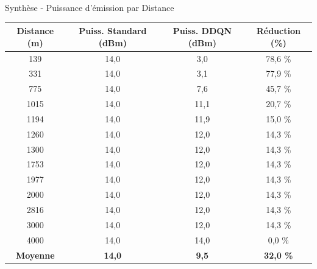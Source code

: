\documentclass[12pt,aspectratio=169]{beamer}
\begin{document}
\begin{frame}[fragile]{Synthèse - Puissance d’émission par Distance}
	\centering
	\begin{table}[H]
		\centering
		\begin{tabular}{|c|c|c|c|}
			\hline
			\textbf{Distance (m)} & \textbf{Puiss. Standard (dBm)} & \textbf{Puiss. DDQN (dBm)} & \textbf{Réduction (\%)} \\
			\hline
			139  & 14,0 & 3,0  & 78,6 \% \\
			331  & 14,0 & 3,1  & 77,9 \% \\
			775  & 14,0 & 7,6  & 45,7 \% \\
			1015 & 14,0 & 11,1 & 20,7 \% \\
			1194 & 14,0 & 11,9 & 15,0 \% \\
			1260 & 14,0 & 12,0 & 14,3 \% \\
			1300 & 14,0 & 12,0 & 14,3 \% \\
			1753 & 14,0 & 12,0 & 14,3 \% \\
			1977 & 14,0 & 12,0 & 14,3 \% \\
			2000 & 14,0 & 12,0 & 14,3 \% \\
			2816 & 14,0 & 12,0 & 14,3 \% \\
			3000 & 14,0 & 12,0 & 14,3 \% \\
			4000 & 14,0 & 14,0 & 0,0 \% \\
			\hline
			\textbf{Moyenne} & \textbf{14,0} & \textbf{9,5} & \textbf{32,0 \%} \\
			\hline
		\end{tabular}
	\end{table}
\end{frame}
\end{document}

